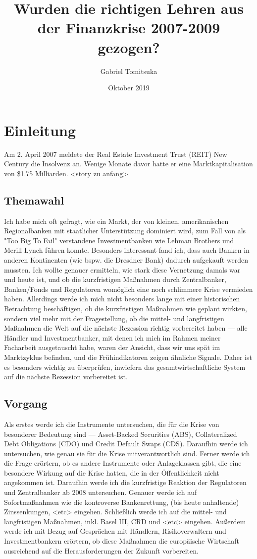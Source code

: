 \documentclass[a4paper,draft]{report}
\begin{document}
\title{Wurden die richtigen Lehren aus der
Finanzkrise 2007-2009 gezogen?}
\author{Gabriel Tomitsuka}
\date{Oktober 2019}
\maketitle
\tableofcontents
\section{Einleitung}
Am 2. April 2007 meldete der Real Estate Investment Trust (REIT) New Century die Insolvenz an.
Wenige Monate davor hatte er eine
Marktkapitalisation von \$1.75 Milliarden.
<story zu anfang>
\subsection{Themawahl}
Ich habe mich oft gefragt, wie ein Markt, der
von kleinen, amerikanischen Regionalbanken mit
staatlicher Unterstützung
dominiert wird, zum Fall von als "Too Big To
Fail" verstandene Investmentbanken wie Lehman
Brothers und Merill Lynch
führen konnte. Besonders interessant fand ich,
dass auch Banken in anderen Kontinenten (wie
bspw. die Dresdner Bank) dadurch
aufgekauft werden mussten. Ich wollte genauer
ermitteln, wie stark diese Vernetzung damals
war und heute ist, und ob
die kurzfristigen Maßnahmen durch
Zentralbanker, Banken/Fonds und Regulatoren
womöglich eine noch schlimmere Krise
vermieden haben.
Allerdings werde ich mich nicht besonders
lange mit einer historischen Betrachtung
beschäftigen, ob die kurzfristigen
Maßnahmen wie geplant wirkten, sondern viel
mehr mit der Fragestellung, ob die mittel- und
langfristigen Maßnahmen die Welt
auf die nächste Rezession richtig vorbereitet
haben --- alle Händler und Investmentbanker, mit
denen ich mich im Rahmen meiner Facharbeit ausgetauscht habe, waren
der Ansicht, dass wir uns spät im Marktzyklus
befinden, und die Frühindikatoren zeigen
ähnliche Signale.
Daher ist es besonders wichtig zu
überprüfen, inwiefern das gesamtwirtschaftliche System auf die nächste Rezession vorbereitet ist.
\subsection{Vorgang}
Als erstes werde ich die Instrumente
untersuchen, die für die Krise von besonderer Bedeutung sind --- Asset-Backed Securities
(ABS),
Collateralized Debt Obligations (CDO) und
Credit Default Swaps (CDS). Daraufhin werde
ich untersuchen, wie genau sie für die
Krise mitverantwortlich sind. Ferner werde ich
die Frage erörtern, ob es andere Instrumente
oder Anlageklassen gibt, die eine
besondere Wirkung auf die Krise hatten, die in
der Öffentlichkeit nicht angekommen ist.
Daraufhin werde ich die kurzfristige Reaktion
der Regulatoren und Zentralbanker ab 2008
untersuchen. Genauer werde ich auf
Sofortmaßnahmen wie die kontroverse
Bankenrettung, (bis heute anhaltende)
Zinssenkungen, <etc> eingehen.
Schließlich werde ich auf die mittel- und
langfristigen Maßnahmen, inkl. Basel
III, CRD und <etc> eingehen. Außerdem
werde ich mit Bezug auf Gesprächen mit
Händlern, Risikoverwaltern und
Investmentbankern erörtern, ob diese
Maßnahmen die europäische
Wirtschaft ausreichend auf die
Herausforderungen der Zukunft vorbereiten.
\end{document}
